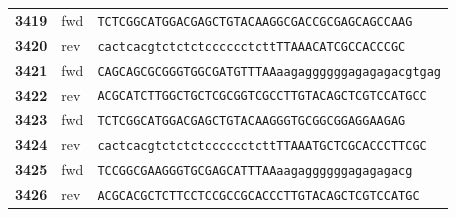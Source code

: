 \begin{longtable}{|Y{1.7cm}|Y{1.7cm}|L{10.5cm}|}
\textbf{3419} & \gls{fwd} & \texttt{TCTCGGCATGGACGAGCTGTACAAGGCGACCGCGAGCAGCCAAG} \\
\textbf{3420} & \gls{rev} & \texttt{cactcacgtctctctcccccctcttTTAAACATCGCCACCCGC} \\  
\textbf{3421} & \gls{fwd} & \texttt{CAGCAGCGCGGGTGGCGATGTTTAAaagaggggggagagagacgtgag} \\
\textbf{3422} & \gls{rev} & \texttt{ACGCATCTTGGCTGCTCGCGGTCGCCTTGTACAGCTCGTCCATGCC} \\

\textbf{3423} & \gls{fwd} & \texttt{TCTCGGCATGGACGAGCTGTACAAGGGTGCGGCGGAGGAAGAG} \\
\textbf{3424} & \gls{rev} & \texttt{cactcacgtctctctcccccctcttTTAAATGCTCGCACCCTTCGC} \\  
\textbf{3425} & \gls{fwd} & \texttt{TCCGGCGAAGGGTGCGAGCATTTAAaagaggggggagagagacg} \\
\textbf{3426} & \gls{rev} & \texttt{ACGCACGCTCTTCCTCCGCCGCACCCTTGTACAGCTCGTCCATGC} \\
\end{longtable}


